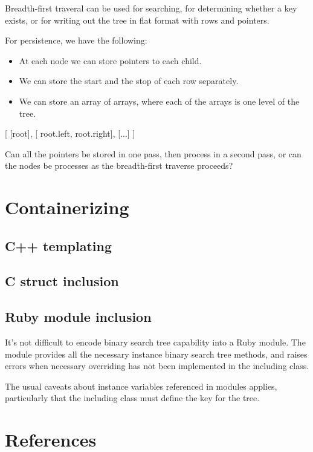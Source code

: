 \documentclass{article}
\begin{document}
Breadth-first traveral can be used for searching, for determining whether a key exists,
or for writing out the tree in flat format with rows and pointers.

For persistence, we have the following:

\begin{itemize}
\item At each node we can store pointers to each child.
\item We can store the start and the stop of each row separately.
\item We can store an array of arrays, where each of the arrays is
      one level of the tree.
\end{itemize}

[
 [root],
 [ root.left, root.right],
 [...]
]

Can all the pointers be stored in one pass, then process in a second pass,
or can the nodes be processes as the breadth-first traverse proceeds?



\section{Containerizing}

\subsection{C++ templating}

\subsection{C struct inclusion}

\subsection{Ruby module inclusion}

It's not difficult to encode binary search tree capability into a Ruby module.
The module provides all the necessary instance binary search tree methods, and
raises errors when necessary overriding has not been implemented in the
including class.

The usual caveats about instance variables referenced in modules applies,
particularly that the including class must define the key for the tree.

\section{References}
\end{document}
